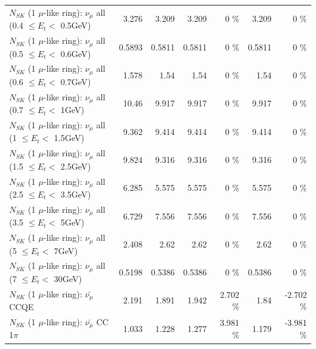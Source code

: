 \begin{table}
\begin{tabular}{| l | r | r | r  r | r  r |}
       $N_{SK}$ (1 $\mu$-like ring): $\nu_{\mu}$ all (0.4 $\leq E_{t} <$ 0.5GeV) &           3.276 &           3.209 &           3.209 &        0 \%  &           3.209 &        0 \%  \\ 
       $N_{SK}$ (1 $\mu$-like ring): $\nu_{\mu}$ all (0.5 $\leq E_{t} <$ 0.6GeV) &          0.5893 &          0.5811 &          0.5811 &        0 \%  &          0.5811 &        0 \%  \\ 
       $N_{SK}$ (1 $\mu$-like ring): $\nu_{\mu}$ all (0.6 $\leq E_{t} <$ 0.7GeV) &           1.578 &            1.54 &            1.54 &        0 \%  &            1.54 &        0 \%  \\ 
         $N_{SK}$ (1 $\mu$-like ring): $\nu_{\mu}$ all (0.7 $\leq E_{t} <$ 1GeV) &           10.46 &           9.917 &           9.917 &        0 \%  &           9.917 &        0 \%  \\ 
         $N_{SK}$ (1 $\mu$-like ring): $\nu_{\mu}$ all (1 $\leq E_{t} <$ 1.5GeV) &           9.362 &           9.414 &           9.414 &        0 \%  &           9.414 &        0 \%  \\ 
       $N_{SK}$ (1 $\mu$-like ring): $\nu_{\mu}$ all (1.5 $\leq E_{t} <$ 2.5GeV) &           9.824 &           9.316 &           9.316 &        0 \%  &           9.316 &        0 \%  \\ 
       $N_{SK}$ (1 $\mu$-like ring): $\nu_{\mu}$ all (2.5 $\leq E_{t} <$ 3.5GeV) &           6.285 &           5.575 &           5.575 &        0 \%  &           5.575 &        0 \%  \\ 
         $N_{SK}$ (1 $\mu$-like ring): $\nu_{\mu}$ all (3.5 $\leq E_{t} <$ 5GeV) &           6.729 &           7.556 &           7.556 &        0 \%  &           7.556 &        0 \%  \\ 
           $N_{SK}$ (1 $\mu$-like ring): $\nu_{\mu}$ all (5 $\leq E_{t} <$ 7GeV) &           2.408 &            2.62 &            2.62 &        0 \%  &            2.62 &        0 \%  \\ 
          $N_{SK}$ (1 $\mu$-like ring): $\nu_{\mu}$ all (7 $\leq E_{t} <$ 30GeV) &          0.5198 &          0.5386 &          0.5386 &        0 \%  &          0.5386 &        0 \%  \\ 
\hline
\hline
\hline
                              $N_{SK}$ (1 $\mu$-like ring): $\bar{\nu_\mu}$ CCQE &           2.191 &           1.891 &           1.942 &    2.702 \%  &            1.84 &   -2.702 \%  \\ 
                         $N_{SK}$ (1 $\mu$-like ring): $\bar{\nu_\mu}$ CC 1$\pi$ &           1.033 &           1.228 &           1.277 &    3.981 \%  &           1.179 &   -3.981 \%  \\ 

\end{tabular}
\end{table}
